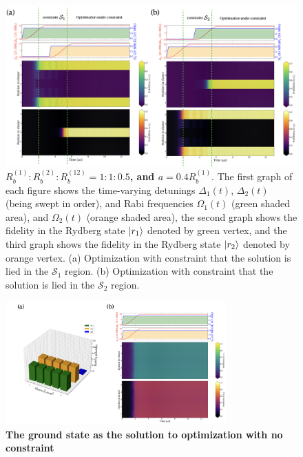 \documentclass[%
 reprint,
nofootinbib,
 amsmath,amssymb,
 aps,
pra,
floatfix,
]{revtex4-2}
\begin{document}
\begin{figure}[ht!]
    \centering
    \includegraphics[width=14cm]{picture/case1_QOconstraint3.png}
    \caption{\textbf{$R^{(1)}_b:R^{(2)}_b:R^{(12)}_b=1:1:0.5$, and $a = 0.4R^{(1)}_b$}. The first graph of each figure shows the time-varying detunings $\Delta_1(t)$, $\Delta_2(t)$ (being swept in order), and Rabi frequencies $\Omega_1(t)$ (green shaded area), and $\Omega_2(t)$ (orange shaded area), the second graph shows the fidelity in the Rydberg state $\ket{r_1}$ denoted by green vertex, and the third graph shows the fidelity in the Rydberg state $\ket{r_2}$ denoted by orange vertex. (a) Optimization with constraint that the solution is lied in the $\mathcal{S}_1$ region. (b) Optimization with constraint that the solution is lied in the $\mathcal{S}_2$ region.}
    \label{fig:case1_sequential_driving_2}
\end{figure}
\begin{figure}[ht!]
    \centering
    \includegraphics[width=8.5cm]{picture/case1_QOconstraint1.png}
    \caption{\textbf{The ground state as the solution to optimization with no constraint}}
    \label{fig:case1_same_driving}
\end{figure}
\end{document}
